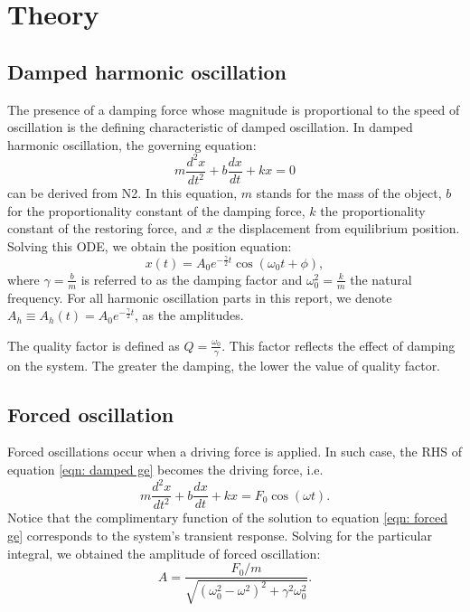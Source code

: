 \documentclass[a4paper,12pt]{article}
\begin{document}
\section{Theory}
\subsection{Damped harmonic oscillation}
The presence of a damping force whose magnitude is proportional to the speed of oscillation is the defining characteristic of damped oscillation\cite[Chapter~14]{Young&Freedman}. In damped harmonic oscillation, the governing equation:
\begin{equation}
	\label{eqn: damped ge}
	m\frac{d^2x}{dt^2}+b\frac{dx}{dt}+kx=0
\end{equation}
can be derived from N2. In this equation, \( m \) stands for the mass of the object, \( b \) for the  proportionality constant of the damping force, \( k \) the proportionality constant of the restoring force, and \( x \) the displacement from equilibrium position.
Solving this ODE, we obtain the position equation:
\begin{equation}
	\label{eqn: damped sln}
	x(t) = A_0e^{-\frac{\gamma}{2}t}\cos(\omega_0 t + \phi),
\end{equation}
where \( \gamma = \frac{b}{m} \) is referred to as the damping factor and  \( \omega_0^2 = \frac{k}{m} \) the natural frequency. For all harmonic oscillation parts in this report, we denote \( A_h \equiv A_h(t) = A_0e^{-\frac{\gamma}{2}t} \), as the amplitudes.

The quality factor is defined as \( Q = \frac{\omega_0}{\gamma} \). This factor reflects the effect of damping on the system. The greater the damping, the lower the value of quality factor. 
\subsection{Forced oscillation}
Forced oscillations \cite[Chapter~4]{King} occur when a driving force is applied. In such case, the RHS of equation \ref{eqn: damped ge} becomes the driving force, i.e.
\begin{equation}
	\label{eqn: forced ge}
	m\frac{d^2x}{dt^2}+b\frac{dx}{dt}+kx = F_0\cos(\omega t).
\end{equation}
Notice that the complimentary function of the solution to equation \ref{eqn: forced ge} corresponds to the system's transient response. Solving for the particular integral, we obtained the amplitude of forced oscillation:
\begin{equation}
	A = \frac{F_0/m}{\sqrt{(\omega_0^2 - \omega^2)^2 + \gamma^2 \omega_0^2}}.
\end{equation}
\end{document}
